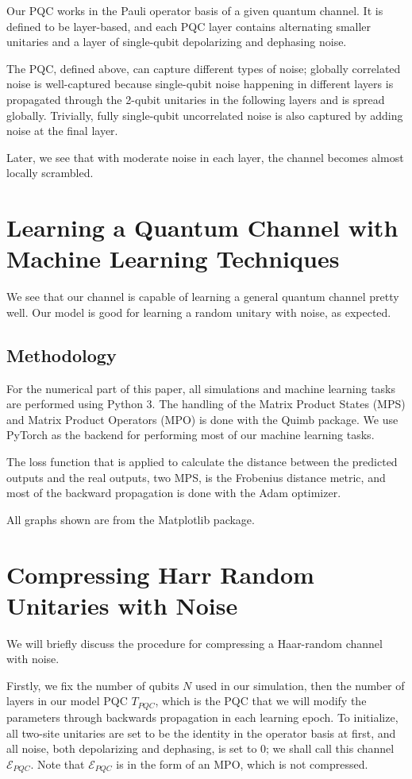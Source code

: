 \documentclass[%
 reprint,
superscriptaddress,
 amsmath,amssymb,
 aps,
]{revtex4-2}
\newcommand{\E}{\mathcal{E}}
\begin{document}
Our PQC works in the Pauli operator basis of a given quantum channel. It is defined to be layer-based, and each PQC layer contains alternating smaller unitaries and a layer of single-qubit depolarizing and dephasing noise.

The PQC, defined above, can capture different types of noise; globally correlated noise is well-captured because single-qubit noise happening in different layers is propagated through the 2-qubit unitaries in the following layers and is spread globally. Trivially, fully single-qubit uncorrelated noise is also captured by adding noise at the final layer. 

Later, we see that with moderate noise in each layer, the channel becomes almost locally scrambled.


\section{Learning a Quantum Channel with Machine Learning Techniques}
We see that our channel is capable of learning a general quantum channel pretty well. Our model is good for learning a random unitary with noise, as expected.

\subsection{Methodology}

For the numerical part of this paper, all simulations and machine learning tasks are performed using Python 3. The handling of the Matrix Product States (MPS) and Matrix Product Operators (MPO) is done with the Quimb package. We use PyTorch as the backend for performing most of our machine learning tasks. 

The loss function that is applied to calculate the distance between the predicted outputs and the real outputs, two MPS, is the Frobenius distance metric, and most of the backward propagation is done with the Adam optimizer.

All graphs shown are from the Matplotlib package. 



\section{Compressing Harr Random Unitaries with Noise}

We will briefly discuss the procedure for compressing a Haar-random channel with noise. 

Firstly, we fix the number of qubits $N$ used in our simulation, then the number of layers in our model PQC $T_{PQC}$, which is the PQC that we will modify the parameters through backwards propagation in each learning epoch. To initialize, all two-site unitaries are set to be the identity in the operator basis at first, and all noise, both depolarizing and dephasing, is set to 0; we shall call this channel $\E_{PQC}$. Note that $\E_{PQC}$ is in the form of an MPO, which is not compressed.
\end{document}
